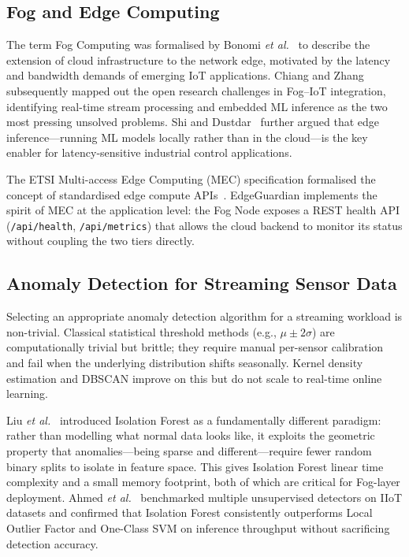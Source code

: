 \documentclass[conference]{IEEEtran}
\begin{document}
\subsection{Fog and Edge Computing}

The term Fog Computing was formalised by Bonomi \textit{et al.}~\cite{b3}
to describe the extension of cloud infrastructure to the network edge,
motivated by the latency and bandwidth demands of emerging IoT applications.
Chiang and Zhang~\cite{b4} subsequently mapped out the open research
challenges in Fog--IoT integration, identifying real-time stream processing
and embedded ML inference as the two most pressing unsolved problems. Shi
and Dustdar~\cite{b5} further argued that edge inference---running ML models
locally rather than in the cloud---is the key enabler for latency-sensitive
industrial control applications.

The ETSI Multi-access Edge Computing (MEC) specification formalised the
concept of standardised edge compute APIs~\cite{b6}. EdgeGuardian implements
the spirit of MEC at the application level: the Fog Node exposes a REST
health API (\texttt{/api/health}, \texttt{/api/metrics}) that allows the
cloud backend to monitor its status without coupling the two tiers directly.

\subsection{Anomaly Detection for Streaming Sensor Data}

Selecting an appropriate anomaly detection algorithm for a streaming workload
is non-trivial. Classical statistical threshold methods (e.g., $\mu \pm
2\sigma$) are computationally trivial but brittle; they require manual
per-sensor calibration and fail when the underlying distribution shifts
seasonally. Kernel density estimation and DBSCAN improve on this but do not
scale to real-time online learning.

Liu \textit{et al.}~\cite{b7} introduced Isolation Forest as a fundamentally
different paradigm: rather than modelling what normal data looks like, it
exploits the geometric property that anomalies---being sparse and
different---require fewer random binary splits to isolate in feature space.
This gives Isolation Forest linear time complexity and a small memory
footprint, both of which are critical for Fog-layer deployment.
Ahmed \textit{et al.}~\cite{b8} benchmarked multiple unsupervised detectors
on IIoT datasets and confirmed that Isolation Forest consistently outperforms
Local Outlier Factor and One-Class SVM on inference throughput without
sacrificing detection accuracy.
\end{document}
